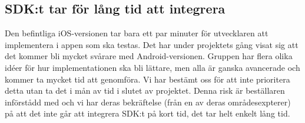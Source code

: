 \subsection{SDK:t tar för lång tid att integrera}
Den befintliga iOS-versionen tar bara ett par minuter för utvecklaren att implementera i appen som ska testas. Det har under projektets gång visat sig att det kommer bli mycket svårare med Android-versionen. Gruppen har flera olika idéer för hur implementationen ska bli lättare, men alla är ganska avancerade och kommer ta mycket tid att genomföra. Vi har bestämt oss för att inte prioritera detta utan ta det i mån av tid i slutet av projektet. Denna risk är beställaren införstådd med och vi har deras bekräftelse (från en av deras områdesexpterer) på att det inte går att integrera SDK:t på kort tid, det tar helt enkelt lång tid. 
